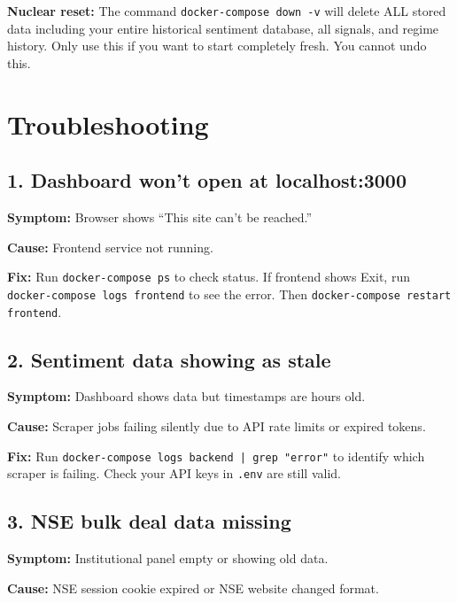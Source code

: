 \documentclass[12pt, a4paper]{report}
\begin{document}
\begin{warningbox}
\textbf{Nuclear reset:} The command \texttt{docker-compose down -v} will delete ALL stored data including your entire historical sentiment database, all signals, and regime history. Only use this if you want to start completely fresh. You cannot undo this.
\end{warningbox}

\chapter{Troubleshooting}

\section{1. Dashboard won't open at localhost:3000}

\textbf{Symptom:} Browser shows ``This site can't be reached.''

\textbf{Cause:} Frontend service not running.

\textbf{Fix:} Run \texttt{docker-compose ps} to check status. If frontend shows Exit, run \texttt{docker-compose logs frontend} to see the error. Then \texttt{docker-compose restart frontend}.

\section{2. Sentiment data showing as stale}

\textbf{Symptom:} Dashboard shows data but timestamps are hours old.

\textbf{Cause:} Scraper jobs failing silently due to API rate limits or expired tokens.

\textbf{Fix:} Run \texttt{docker-compose logs backend | grep "error"} to identify which scraper is failing. Check your API keys in \texttt{.env} are still valid.

\section{3. NSE bulk deal data missing}

\textbf{Symptom:} Institutional panel empty or showing old data.

\textbf{Cause:} NSE session cookie expired or NSE website changed format.
\end{document}
